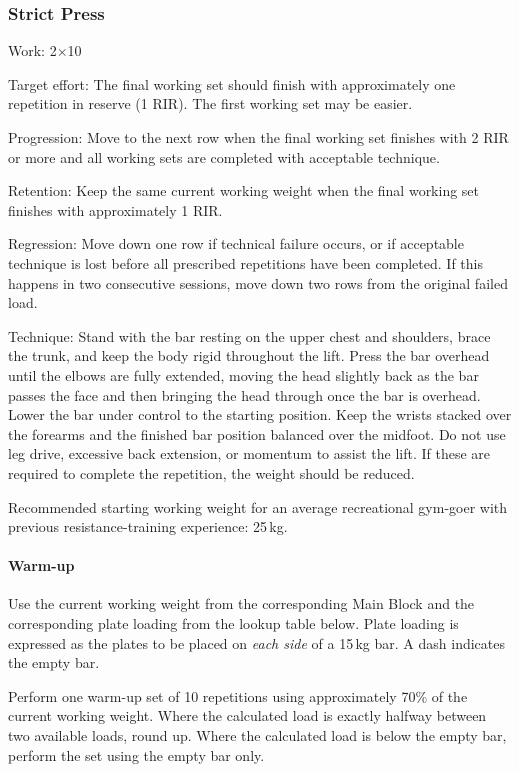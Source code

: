 \documentclass[11pt,a4paper]{article}
\begin{document}
\newpage
\subsubsection{Strict Press}

Work: 2$\times$10

Target effort: The final working set should finish with approximately one repetition in reserve (1 RIR). The first working set may be easier.

Progression: Move to the next row when the final working set finishes with 2 RIR or more and all working sets are completed with acceptable technique.

Retention: Keep the same current working weight when the final working set finishes with approximately 1 RIR.

Regression: Move down one row if technical failure occurs, or if acceptable technique is lost before all prescribed repetitions have been completed. If this happens in two consecutive sessions, move down two rows from the original failed load.

Technique: Stand with the bar resting on the upper chest and shoulders, brace the trunk, and keep the body rigid throughout the lift. Press the bar overhead until the elbows are fully extended, moving the head slightly back as the bar passes the face and then bringing the head through once the bar is overhead. Lower the bar under control to the starting position. Keep the wrists stacked over the forearms and the finished bar position balanced over the midfoot. Do not use leg drive, excessive back extension, or momentum to assist the lift. If these are required to complete the repetition, the weight should be reduced.

Recommended starting working weight for an average recreational gym-goer with previous resistance-training experience: 25\,kg.

\paragraph{Warm-up}

Use the current working weight from the corresponding Main Block and the corresponding plate loading from the lookup table below. Plate loading is expressed as the plates to be placed on \emph{each side} of a 15\,kg bar. A dash indicates the empty bar.

Perform one warm-up set of 10 repetitions using approximately 70\% of the current working weight. Where the calculated load is exactly halfway between two available loads, round up. Where the calculated load is below the empty bar, perform the set using the empty bar only.
\end{document}
